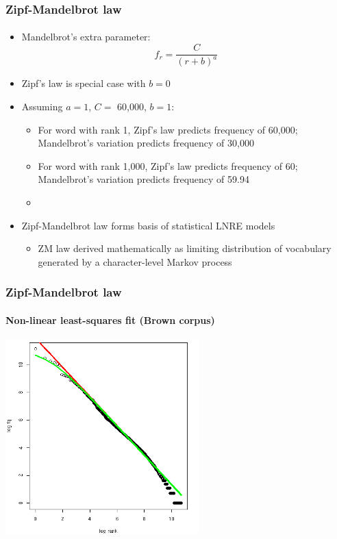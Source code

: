 \documentclass[handout,notes=show,t]{beamer} %
\begin{document}
\begin{frame}
  \frametitle{Zipf-Mandelbrot law}
  \framesubtitle{\citet{Mandelbrot:53,Mandelbrot:62}}

  \begin{itemize}
    \item Mandelbrot's extra parameter:
    \[
    f_r = \frac{C}{(r + b)^a}
    \]
  \item Zipf's law is special case with $b=0$
  \item<2-> Assuming $a=1$, $C=$ 60,000, $b=1$:
    \begin{itemize}
    \item For word with rank 1, Zipf's law predicts frequency of
      60,000; Mandelbrot's variation predicts frequency of 30,000
    \item For word with rank 1,000,  Zipf's law predicts frequency of
      60; Mandelbrot's variation predicts frequency of 59.94
    \item[]
    \end{itemize}
  \item<3-> Zipf-Mandelbrot law forms basis of statistical LNRE models%
    \begin{itemize}
    \item ZM law derived mathematically as limiting distribution of
      vocabulary generated by a character-level Markov process
    \end{itemize}
  \end{itemize}
\end{frame}

\begin{frame}
  \frametitle{Zipf-Mandelbrot law} 
  \framesubtitle{Non-linear least-squares fit (Brown corpus)}

  \ungap[1.5]
  \begin{center}
    \includegraphics[height=7.5cm]{img/brown-zipf-man-rf}
  \end{center}
\end{frame}
\end{document}
